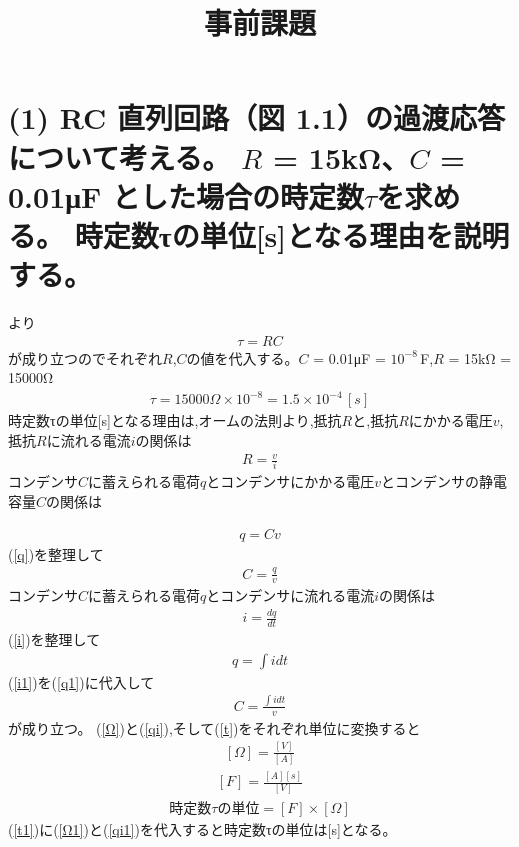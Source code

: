\documentclass[12pt,a4j]{jarticle}
\begin{document}
\title{事前課題}
\maketitle
\section{(1)  RC 直列回路（図 1.1）の過渡応答について考える。 
$R$ = 15kΩ、$C$ = 0.01μF  とした場合の時定数$τ$を求める。 
時定数τの単位[s]となる理由を説明する。}
\cite{a}より
\begin{eqnarray}
  \label{t}
τ=RC
\end{eqnarray}
が成り立つのでそれぞれ$R$,$C$の値を代入する。$C$ = 0.01μF = $10^{-8}$\,F,$R$ = 15kΩ = 15000Ω
\begin{eqnarray}
  τ=15000Ω\times10^{-8}=1.5\times10^{-4}\,[s]
\end{eqnarray}
時定数τの単位[s]となる理由は,オームの法則より,抵抗$R$と,抵抗$R$にかかる電圧$v$,抵抗$R$に流れる電流$i$の関係は
\begin{eqnarray}
  \label{Ω}
  R=\frac{v}{i}
\end{eqnarray}
コンデンサ$C$に蓄えられる電荷$q$とコンデンサにかかる電圧$v$とコンデンサの静電容量$C$の関係は

\begin{eqnarray}
  \label{q}
  q=Cv
\end{eqnarray}
(\ref{q})を整理して
\begin{eqnarray}
  \label{q1}
  C=\frac{q}{v}
\end{eqnarray}
コンデンサ$C$に蓄えられる電荷$q$とコンデンサに流れる電流$i$の関係は
\begin{eqnarray}
  \label{i}
  i=\frac{dq}{dt}
\end{eqnarray}
(\ref{i})を整理して
\begin{eqnarray}
  \label{i1}
  q=\int{idt}
\end{eqnarray}
(\ref{i1})を(\ref{q1})に代入して
\begin{eqnarray}
  \label{qi}
  C=\frac{\int{idt}}{v}
\end{eqnarray}
が成り立つ。
(\ref{Ω})と(\ref{qi}),そして(\ref{t})をそれぞれ単位に変換すると
\begin{eqnarray}
  \label{Ω1}
  [Ω]=\frac{[V]}{[A]}
\end{eqnarray}
\begin{eqnarray}
  \label{qi1}
  [F]=\frac{[A][s]}{[V]}
\end{eqnarray}
\begin{eqnarray}
  \label{t1}
  時定数τの単位=[F]\times[Ω]
\end{eqnarray}
(\ref{t1})に(\ref{Ω1})と(\ref{qi1})を代入すると時定数τの単位は[s]となる。
 
\end{document}
